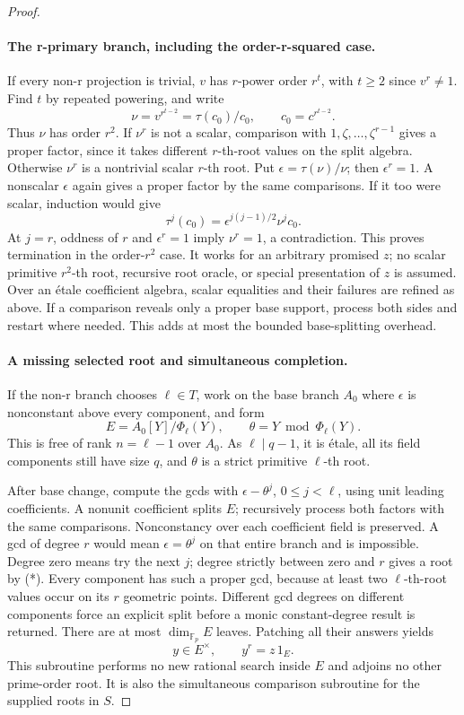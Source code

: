 \documentclass[11pt]{article}
\theoremstyle{definition}
\theoremstyle{remark}
\begin{document}
\begin{proof}
\paragraph{The r-primary branch, including the order-r-squared case.}
If every non-r projection is trivial, \(v\) has \(r\)-power
order \(r^t\), with \(t\ge2\) since \(v^r\ne1\).
Find \(t\) by repeated powering, and write
\[
 \nu=v^{r^{t-2}}=\tau(c_0)/c_0,
 \qquad c_0=c^{r^{t-2}}.
\]
Thus \(\nu\) has order \(r^2\). If \(\nu^r\) is not a
scalar, comparison with \(1,\zeta,\ldots,\zeta^{r-1}\)
gives a proper factor, since it takes different \(r\)-th-root
values on the split algebra. Otherwise \(\nu^r\) is a
nontrivial scalar \(r\)-th root. Put \(\epsilon=\tau(\nu)/\nu\);
then \(\epsilon^r=1\). A nonscalar \(\epsilon\) again gives
a proper factor by the same comparisons. If it too were scalar,
induction would give
\[
            \tau^j(c_0)=\epsilon^{j(j-1)/2}\nu^j c_0.
\]
At \(j=r\), oddness of \(r\) and \(\epsilon^r=1\) imply
\(\nu^r=1\), a contradiction. This proves termination in
the order-\(r^2\) case. It works for an arbitrary promised
\(z\); no scalar primitive \(r^2\)-th root, recursive root
oracle, or special presentation of \(z\) is assumed.
Over an \'etale coefficient algebra, scalar equalities
and their failures are refined as above. If a comparison reveals
only a proper base support, process both sides and restart where
needed. This adds at most the bounded base-splitting overhead.

\paragraph{A missing selected root and simultaneous completion.}
If the non-r branch chooses \(\ell\in T\), work on the base
branch \(A_0\) where \(\epsilon\) is nonconstant above every
component, and form
\[
 E=A_0[Y]/\Phi_\ell(Y),\qquad \theta=Y\bmod\Phi_\ell(Y).
\]
This is free of rank \(n=\ell-1\) over \(A_0\).
As \(\ell\mid q-1\), it is \'etale, all its field
components still have size \(q\), and \(\theta\) is a strict
primitive \(\ell\)-th root.

After base change, compute the gcds with
\(\epsilon-\theta^j\), \(0\le j<\ell\), using unit leading
coefficients. A nonunit coefficient splits \(E\); recursively
process both factors with the same comparisons. Nonconstancy over
each coefficient field is preserved. A gcd of degree \(r\)
would mean \(\epsilon=\theta^j\) on that entire branch and
is impossible. Degree zero means try the next \(j\); degree
strictly between zero and \(r\) gives a root by (*).
Every component has such a proper gcd, because at least two
\(\ell\)-th-root values occur on its \(r\) geometric points.
Different gcd degrees on different components force an explicit
split before a monic constant-degree result is returned.
There are at most \(\dim_{\mathbb F_p}E\) leaves.
Patching all their answers yields
\[
                     y\in E^\times,\qquad y^r=z\,1_E.
\]
This subroutine performs no new rational search inside \(E\)
and adjoins no other prime-order root. It is also the simultaneous
comparison subroutine for the supplied roots in \(S\).


\end{proof}
\end{document}
